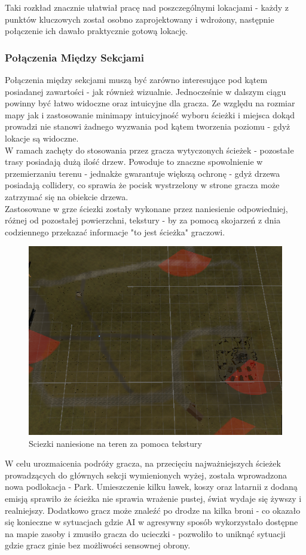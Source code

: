Taki rozkład znacznie ułatwiał pracę nad poszczególnymi lokacjami - każdy z punktów kluczowych został osobno zaprojektowany i wdrożony, następnie połączenie ich dawało praktycznie gotową lokację.
\subsubsection{Połączenia Między Sekcjami}

Połączenia między sekcjami muszą być zarówno interesujące pod kątem posiadanej zawartości - jak również wizualnie.
Jednocześnie w dalszym ciągu powinny być łatwo widoczne oraz intuicyjne dla gracza.
Ze względu na rozmiar mapy  jak i zastosowanie minimapy intuicyjność wyboru ścieżki i miejsca dokąd prowadzi nie stanowi żadnego wyzwania pod kątem tworzenia poziomu - gdyż lokacje są widoczne.\\
W ramach zachęty do stosowania przez gracza wytyczonych ścieżek - pozostałe trasy posiadają dużą ilość drzew.
Powoduje to znaczne spowolnienie w przemierzaniu terenu - jednakże gwarantuje większą ochronę - gdyż drzewa posiadają collidery, co sprawia że pocisk wystrzelony w strone gracza może zatrzymać się na obiekcie drzewa.\\
Zastosowane w grze ściezki zostały wykonane przez naniesienie odpowiedniej, różnej od pozostałej powierzchni, tekstury - by za pomocą skojarzeń z dnia codziennego przekazać informacje "to jest ścieżka" graczowi.
\begin{figure}[h]
    \centering
    \includegraphics[width=0.5\linewidth]{Images/paths.png}
    \caption{Sciezki naniesione na teren za pomoca tekstury}
    \label{fig:enter-label}
\end{figure}

W celu urozmaicenia podróży gracza, na przecięciu najważniejszych ścieżek prowadzących do głównych sekcji wymienionych wyżej, została wprowadzona nowa podlokacja - Park.
Umieszczenie kilku ławek, koszy oraz latarnii z dodaną emisją sprawiło że ścieżka nie sprawia wrażenie pustej, świat wydaje się żywszy i realniejszy.
Dodatkowo gracz może znaleźć po drodze na kilka broni - co okazało się konieczne w sytuacjach gdzie AI w agresywny sposób wykorzystało dostępne na mapie zasoby i zmusiło gracza do ucieczki - pozwoliło to uniknąć sytuacji gdzie gracz ginie bez możliwości sensownej obrony.

